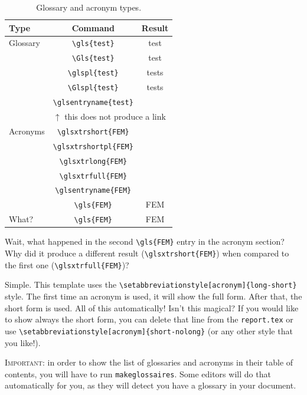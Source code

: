 \begin{table}[h]
	\centering
	\begin{tabular}{lcc}
	  \toprule
	  Type & Command & Result \\
	  \midrule
	  Glossary & \verb|\gls{test}| & \gls{test} \\
		   & \verb|\Gls{test}| & \Gls{test} \\
		   & \verb|\glspl{test}| & \glspl{test} \\
		   & \verb|\Glspl{test}| & \Glspl{test} \\
		   & \verb|\glsentryname{test}| & \glsentryname{test} \\
		   & \multicolumn{2}{l}{$\uparrow$ this does not produce a link} \\
	  \cmidrule{2-3}
	  Acronyms & \verb|\glsxtrshort{FEM}| & \glsxtrshort{FEM} \\
		   & \verb|\glsxtrshortpl{FEM}| & \glsxtrshortpl{FEM} \\
		   & \verb|\glsxtrlong{FEM}| & \glsxtrlong{FEM} \\
		   & \verb|\glsxtrfull{FEM}| & \glsxtrfull{FEM} \\
		   & \verb|\glsentryname{FEM}| & \glsentryname{FEM} \\
	   & \verb|\gls{FEM}| & \gls{FEM} \\
	  What? & \verb|\gls{FEM}| & \gls{FEM} \\
	  \bottomrule
	\end{tabular}
	\caption{Glossary and acronym types.}
	\label{tab:glossaries}
\end{table}

\FloatBarrier

Wait, what happened in the second \verb|\gls{FEM}| entry in the acronym section? Why did it produce a different result (\verb|\glsxtrshort{FEM}|) when compared to the first one (\verb|\glsxtrfull{FEM}|)?

Simple. This template uses the \verb|\setabbreviationstyle[acronym]{long-short}| style. The first time an acronym is used, it will show the full form. After that, the short form is used. All of this automatically! Isn't this magical? If you would like to show always the short form, you can delete that line from the \texttt{report.tex} or use \verb|\setabbreviationstyle[acronym]{short-nolong}| (or any other style that you like!).

\textsc{\color{red}Important:} in order to show the list of glossaries and acronyms in their table of contents, you will have to run \verb|makeglossaires|. Some editors will do that automatically for you, as they will detect you have a glossary in your document.

